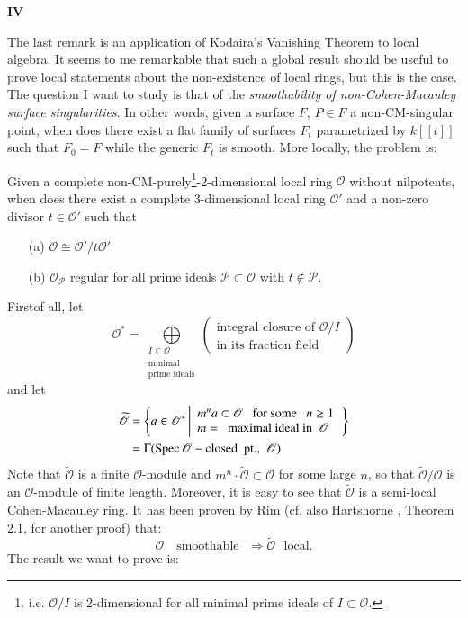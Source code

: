 \bigskip

\begin{center}
{\large\bf IV}
\end{center}
\smallskip 

The last remark is an application of Kodaira's Vanishing Theorem to
local algebra. It seems to me remarkable that such a global result
should be useful to prove local statements about the non-existence of
local rings, but this is the case. The question I want to study is
that of the {\em smoothability of non-Cohen-Macauley surface
singularities}. In other words, given a surface $F$, $P\in F$ a
non-CM-singular point, when does there exist a flat family of surfaces
$F_{t}$ parametrized by $k[[t]]$ such that $F_{0}=F$ while the generic
$F_{t}$ is smooth. More locally, the problem is:

Given a complete non-CM-purely\footnote[2]{i.e. $\mathscr{O}/I$ is
2-dimensional for all minimal prime ideals of
$I\subset \mathscr{O}$.}-2-dimensional local ring $\mathscr{O}$
without nilpotents, when does there exist a complete 3-dimensional
local ring $\mathscr{O}'$ and a non-zero divisor $t\in \mathscr{O}'$
such that
\begin{itemize}
\item[(a)] $\mathscr{O}\cong \mathscr{O}'/t\mathscr{O}'$

\item[(b)] $\mathscr{O}_{\mathscr{P}}$ regular for all prime ideals
$\mathscr{P}\subset \mathscr{O}$ with $t\not\in \mathscr{P}$. 
\end{itemize}

First\pageoriginale of all, let
$$
\mathscr{O}^{*}=\bigoplus\limits_{\substack{I\subset \mathscr{O}\\ \text{minimal}\\ \text{prime
ideals}}} 
\left(
\begin{array}{l}
\text{integral closure of $\mathscr{O}/I$}\\
\text{in its fraction field}
\end{array}
\right)
$$
and let
\begin{align*}
\widetilde{\mathscr{O}} &= \left\{a\in\mathscr{O}^{*}
\left|
\begin{array}{l}
m^{n}a\subset \mathscr{O}\text{~~ for some~~ }n\geq 1\\
m=\text{~ maximal ideal in~ }\mathscr{O}
\end{array}
\right.\right\}\\
&= \Gamma(\operatorname{Spec}\mathscr{O}-\text{closed~ pt.,~ }\mathscr{O})
\end{align*}
Note that $\widetilde{\mathscr{O}}$ is a finite $\mathscr{O}$-module
and $m^{n}\cdot \widetilde{\mathscr{O}}\subset \mathscr{O}$ for some
large $n$, so that $\widetilde{\mathscr{O}}/\mathscr{O}$ is an
$\mathscr{O}$-module of finite length. Moreover, it is easy to see
that $\widetilde{\mathscr{O}}$ is a semi-local Cohen-Macauley ring. It
has been proven by Rim \cite{art01-key14} (cf. also
Hartshorne \cite{art01-key6}, Theorem 2.1, for another proof) that:
$$
\mathscr{O}\text{~~
smoothable~~}\Rightarrow \widetilde{\mathscr{O}}\text{~ local.}
$$
The result we want to prove is:

